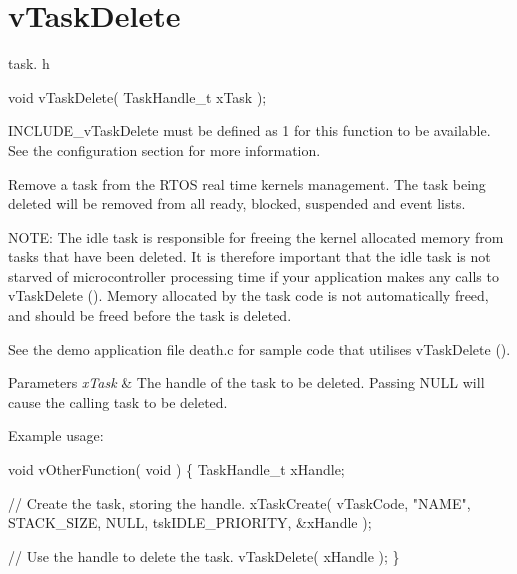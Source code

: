 \hypertarget{group__v_task_delete}{}\section{v\+Task\+Delete}
\label{group__v_task_delete}
task. h 
\begin{DoxyPre}void vTaskDelete( TaskHandle\_t xTask );\end{DoxyPre}


I\+N\+C\+L\+U\+D\+E\+\_\+v\+Task\+Delete must be defined as 1 for this function to be available. See the configuration section for more information.

Remove a task from the R\+T\+OS real time kernel\textquotesingle{}s management. The task being deleted will be removed from all ready, blocked, suspended and event lists.

N\+O\+TE\+: The idle task is responsible for freeing the kernel allocated memory from tasks that have been deleted. It is therefore important that the idle task is not starved of microcontroller processing time if your application makes any calls to v\+Task\+Delete (). Memory allocated by the task code is not automatically freed, and should be freed before the task is deleted.

See the demo application file death.\+c for sample code that utilises v\+Task\+Delete ().


\begin{DoxyParams}{Parameters}
{\em x\+Task} & The handle of the task to be deleted. Passing N\+U\+LL will cause the calling task to be deleted.\\
\hline
\end{DoxyParams}
Example usage\+: 
\begin{DoxyPre}
void vOtherFunction( void )
\{
TaskHandle\_t xHandle;\end{DoxyPre}



\begin{DoxyPre}    // Create the task, storing the handle.
    xTaskCreate( vTaskCode, "NAME", STACK\_SIZE, NULL, tskIDLE\_PRIORITY, \&xHandle );\end{DoxyPre}



\begin{DoxyPre}    // Use the handle to delete the task.
    vTaskDelete( xHandle );
\}
  \end{DoxyPre}
 